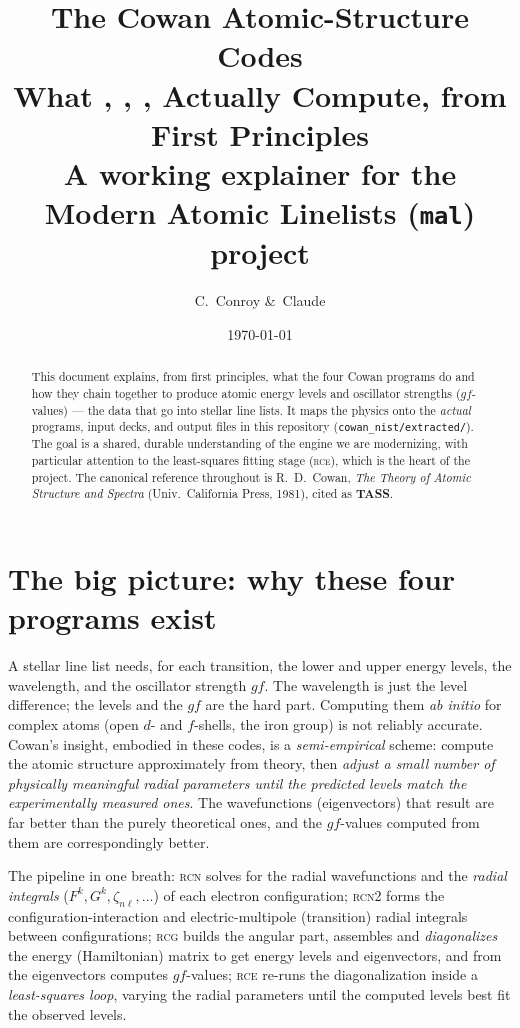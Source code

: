 \documentclass[11pt]{article}
\title{\textbf{The Cowan Atomic-Structure Codes}\\[2pt]
\large What \prog{rcn}, \prog{rcn2}, \prog{rcg}, \prog{rce} Actually Compute,
from First Principles\\[6pt]
\normalsize A working explainer for the Modern Atomic Linelists (\texttt{mal}) project}
\author{C.\ Conroy \&\ Claude}
\date{\today}
\newcommand{\Fk}{F^{k}}
\newcommand{\Gk}{G^{k}}
\newcommand{\znl}{\zeta_{n\ell}}
\newcommand{\prog}[1]{\textsc{#1}}
\newcommand{\file}[1]{\texttt{#1}}
\begin{document}
\maketitle

\begin{abstract}
\noindent
This document explains, from first principles, what the four Cowan programs do
and how they chain together to produce atomic energy levels and oscillator
strengths ($gf$-values) --- the data that go into stellar line lists. It maps the
physics onto the \emph{actual} programs, input decks, and output files in this
repository (\file{cowan\_nist/extracted/}). The goal is a shared, durable
understanding of the engine we are modernizing, with particular attention to the
least-squares fitting stage (\prog{rce}), which is the heart of the project. The
canonical reference throughout is R.~D.\ Cowan, \emph{The Theory of Atomic
Structure and Spectra} (Univ.\ California Press, 1981), cited as \textbf{TASS}.
\end{abstract}

\tableofcontents

\section{The big picture: why these four programs exist}

A stellar line list needs, for each transition, the lower and upper energy
levels, the wavelength, and the oscillator strength $gf$. The wavelength is just
the level difference; the levels and the $gf$ are the hard part. Computing them
\emph{ab initio} for complex atoms (open $d$- and $f$-shells, the iron group) is
not reliably accurate. Cowan's insight, embodied in these codes, is a
\emph{semi-empirical} scheme: compute the atomic structure approximately from
theory, then \emph{adjust a small number of physically meaningful radial
parameters until the predicted levels match the experimentally measured ones}.
The wavefunctions (eigenvectors) that result are far better than the purely
theoretical ones, and the $gf$-values computed from them are correspondingly
better.

The pipeline in one breath: \prog{rcn} solves for the radial wavefunctions and
the \emph{radial integrals} ($\Fk,\Gk,\znl,\dots$) of each electron
configuration; \prog{rcn2} forms the configuration-interaction and
electric-multipole (transition) radial integrals between configurations;
\prog{rcg} builds the angular part, assembles and \emph{diagonalizes} the energy
(Hamiltonian) matrix to get energy levels and eigenvectors, and from the
eigenvectors computes $gf$-values; \prog{rce} re-runs the diagonalization inside
a \emph{least-squares loop}, varying the radial parameters until the computed
levels best fit the observed levels.
\end{document}
